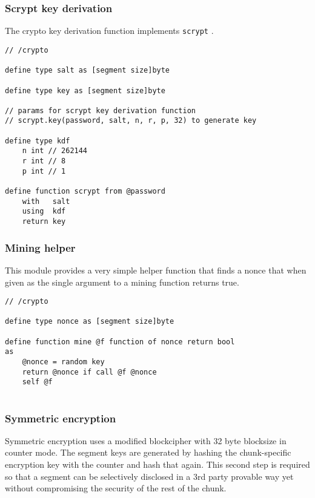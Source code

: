 \subsubsection{Scrypt key derivation}

The crypto key derivation function implements \lstinline{scrypt} \cite{percival2009stronger}.

\begin{definition}\label{def:scrypt}
\begin{lstlisting}[language=buzz1]
// /crypto

define type salt as [segment size]byte

define type key as [segment size]byte

// params for scrypt key derivation function
// scrypt.key(password, salt, n, r, p, 32) to generate key

define type kdf
    n int // 262144
    r int // 8
    p int // 1

define function scrypt from @password
    with   salt 
    using  kdf
    return key

\end{lstlisting}
\end{definition}  

\subsubsection{Mining helper}

This module provides a very simple helper function that finds a nonce that when given as the single argument to a mining function returns true.

\begin{definition}\label{def:mine}
\begin{lstlisting}[language=buzz1]
// /crypto

define type nonce as [segment size]byte

define function mine @f function of nonce return bool
as
    @nonce = random key
    return @nonce if call @f @nonce
    self @f
    
\end{lstlisting}
\end{definition}  

\subsubsection{Symmetric encryption}

Symmetric encryption uses a modified blockcipher with 32 byte blocksize in counter mode.
The segment keys are generated by hashing the chunk-specific encryption key with the counter and hash that again. This second step is required so that a segment can be selectively disclosed in a 3rd party provable way yet without compromising the security of the rest of the chunk.

